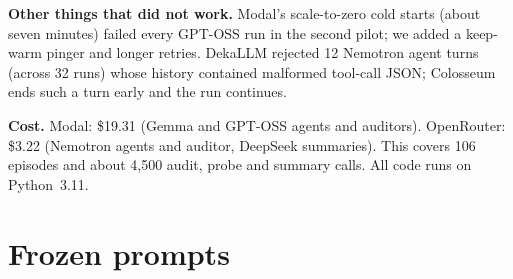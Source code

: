 \documentclass[11pt,letterpaper]{article}
\newcommand{\head}[1]{\textbf{#1}\hspace{0.3em}}
\begin{document}
\head{Other things that did not work.} Modal's scale-to-zero cold starts (about seven minutes) failed every GPT-OSS run in the second pilot; we added a keep-warm pinger and longer retries. DekaLLM rejected 12 Nemotron agent turns (across 32 runs) whose history contained malformed tool-call JSON; Colosseum ends such a turn early and the run continues.

\head{Cost.} Modal: \$19.31 (Gemma and GPT-OSS agents and auditors). OpenRouter: \$3.22 (Nemotron agents and auditor, DeepSeek summaries). This covers 106 episodes and about 4,500 audit, probe and summary calls. All code runs on Python~3.11.

\section{Frozen prompts}
\setcounter{table}{0}\setcounter{figure}{0}
\end{document}
